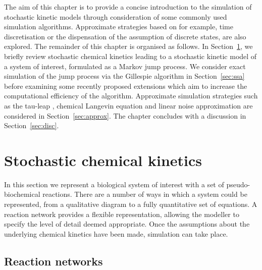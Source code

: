 \documentclass[12pt, DIV12]{scrartcl}
\begin{document}
The aim of this chapter is to provide a concise introduction 
to the simulation of stochastic kinetic models through consideration of 
some commonly used simulation algorithms. Approximate strategies based on 
for example, time discretisation or the dispensation of the assumption of 
discrete states, are also explored. The remainder of this chapter is organised 
as follows. In Section~\ref{sec:stochkin}, we briefly review stochastic 
chemical kinetics leading to a stochastic 
kinetic model of a system of interest, formulated as a Markov 
jump process. We consider exact simulation of the jump process via the 
Gillespie algorithm \citep{Gillespie77} in Section~\ref{sec:ssa} before examining some 
recently proposed extensions which aim to increase the computational efficiency 
of the algorithm. Approximate simulation strategies such as the tau-leap \citep{Gillespie01}, 
chemical Langevin equation \citep{Gillespie92b,Gillespie00} and linear noise 
approximation \citep{kampen2001} are considered  in Section~\ref{sec:approx}. The chapter concludes 
with a discussion in Section~\ref{sec:disc}.  




\section{Stochastic chemical kinetics}
\label{sec:stochkin}

In this section we represent a biological system of interest with a set of
pseudo-biochemical reactions. There are a number of ways in which a system could
be represented, from a qualitative diagram to a fully quantitative set of
equations. A reaction network provides a flexible representation, allowing the
modeller to specify the level of detail deemed appropriate. Once the assumptions
about the underlying chemical kinetics have been made, simulation can take
place.

\subsection{Reaction networks}
\end{document}
